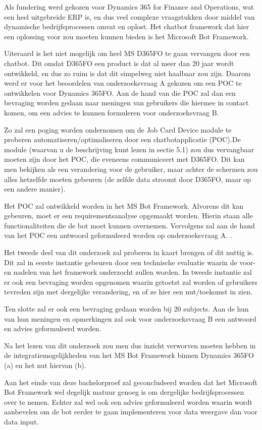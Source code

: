 Als fundering werd gekozen voor Dynamics 365 for Finance and Operations, wat een heel uitgebreide ERP is, en dus veel complexe vraagstukken door middel van dynamische bedrijfsprocessen omvat en oplost. Het chatbot framework dat hier een oplossing voor zou moeten kunnen bieden is het Microsoft Bot Framework.

Uiteraard is het niet mogelijk om heel MS D365FO te gaan vervangen door een chatbot. Dit omdat D365FO een product is dat al meer dan 20 jaar wordt ontwikkeld, en dus zo ruim is dat dit simpelweg niet haalbaar zou zijn. Daarom werd er voor het beoordelen van onderzoeksvraag A gekozen om een POC te ontwikkelen voor Dynamics 365FO. Aan de hand van die POC zal dan een bevraging worden gedaan naar meningen van gebruikers die hiermee in contact komen, om een advies te kunnen formuleren voor onderzoeksvraag B. 

Zo zal een poging worden ondernomen om de Job Card Device module te proberen automatiseren/optimaliseren door een chatbotapplicatie (POC).De module (waarvan u de beschrijving kunt lezen in sectie 5.1) zou dus vervangbaar moeten zijn door het POC, die eveneens communiceert met D365FO. Dit kan men bekijken als een verandering voor de gebruiker, maar achter de schermen zou alles hetzelfde moeten gebeuren (de zelfde data stroomt door D365FO, maar op een andere manier). 

Het POC zal ontwikkeld worden in het MS Bot Framework. Alvorens dit kan gebeuren, moet er een requirementsanalyse opgemaakt worden. Hierin staan alle functionaliteiten die de bot moet kunnen overnemen. Vervolgens zal aan de hand van het POC een antwoord geformuleerd worden op onderzoeksvraag A. . 

Het tweede deel van dit onderzoek zal proberen in kaart brengen of dit nuttig is. Dit zal in eerste instantie gebeuren door een technische evaluatie waarin de voor- en nadelen van het framework onderzocht zullen worden. In tweede instantie zal er ook een bevraging worden opgenomen waarin getoetst zal worden of gebruikers tevreden zijn met dergelijke verandering, en of ze hier een nut/toekomst in zien.
 
Ten slotte zal er ook een bevraging gedaan worden bij 20 subjects. Aan de hun van hun meningen en opmerkingen zal ook voor onderzoeksvraag B een antwoord en advies geformuleerd worden. 

Na het lezen van dit onderzoek zou men dus inzicht verworven moeten hebben in de integratiemogelijkheden van het MS Bot Framework binnen Dynamics 365FO (a) en het nut hiervan (b). 

Aan het einde van deze bachelorproef zal geconcludeerd worden dat het Microsoft Bot Framework wel degelijk matuur genoeg is om dergelijke bedrijfsprocessen over te nemen. Echter zal wel ook een advies geformuleerd worden waarin wordt aanbevelen om de bot eerder te gaan implementeren voor data weergave dan voor data input. 










